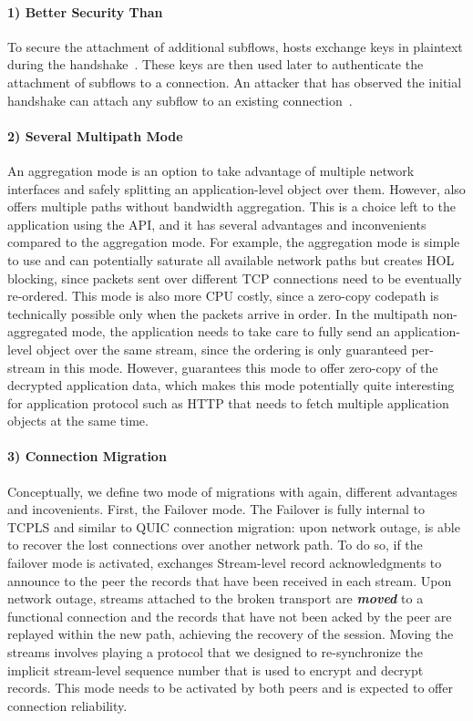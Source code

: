 \paragraph*{1) Better Security Than \mptcp}
To secure the attachment of additional subflows, \mptcp hosts exchange keys in plaintext
during the handshake~\cite{rfc6824, rfc8684}. These keys are then used later to
authenticate the attachment of subflows to a connection. An attacker that has
observed the initial handshake can attach any subflow to an existing \mptcp
connection~\cite{rfc6181}.

\paragraph*{2) Several Multipath Mode}
An aggregation mode is an option to take advantage of multiple network
interfaces and safely splitting an application-level object over them. However,
\tcpls also offers multiple paths without bandwidth aggregation.
This is a choice left to the application using the API, and it has several
advantages and inconvenients compared to the aggregation mode. For example, the
aggregation mode is simple to use and can potentially saturate all available
network paths but creates HOL blocking, since packets sent over different TCP
connections need to be eventually re-ordered. This mode is also more CPU
costly, since a zero-copy codepath is technically possible only when the packets
arrive in order. In the multipath non-aggregated mode, the application needs to
take care to fully send an application-level object over the same stream, since
the ordering is only guaranteed per-stream in this mode. However, \tcpls
guarantees this mode to offer zero-copy of the decrypted application data, which
makes this mode potentially quite interesting for application protocol such as
HTTP that needs to fetch multiple application objects at the same time.

\paragraph*{3) Connection Migration}
Conceptually, we define two mode of migrations with again, different advantages
and incovenients. First, the Failover mode. The Failover is fully internal to
TCPLS and similar to QUIC connection migration: upon network outage, \tcpls is
able to recover the lost \tcp connections over another network path. To do so, if
the failover mode is activated, \tcpls exchanges Stream-level record
acknowledgments to announce to the peer the records that have been received in
each stream. Upon network outage, streams attached to the broken transport are
\textbf{\textit{moved}} to a functional \tcp connection and  the records that have not been acked
by the peer are replayed within the new path, achieving the recovery of the session.
Moving the streams involves playing a protocol that we designed to
re-synchronize the implicit stream-level sequence number that is used to
encrypt and decrypt records. This mode needs to be activated by both peers and
is expected to offer connection reliability.

